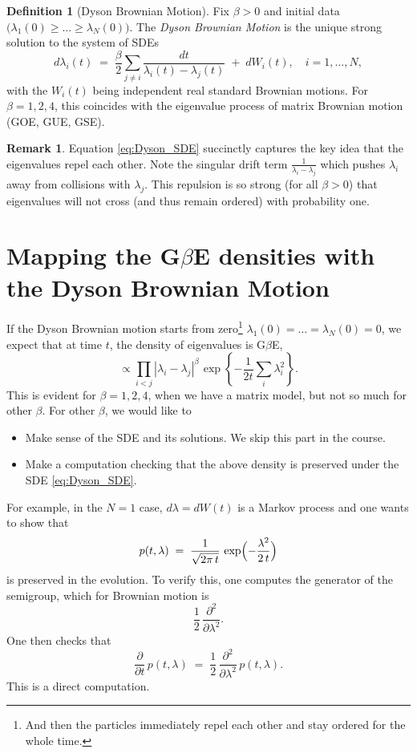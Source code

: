 \documentclass[letterpaper,11pt,oneside,reqno]{article}
\numberwithin{equation}{section}
\newcommand{\ssp}{\hspace{1pt}}
\theoremstyle{definition}
\newtheorem{definition}[proposition]{Definition}
\newtheorem{remark}[proposition]{Remark}
\begin{document}
\begin{definition}[Dyson Brownian Motion]
\label{def:DBM}
Fix $\beta>0$ and initial data $\bigl(\lambda_1(0)\ge \dots \ge \lambda_N(0)\bigr)$. The \emph{Dyson Brownian Motion} is the unique strong solution to the system of SDEs
\begin{equation}
\label{eq:Dyson_SDE}
d\lambda_i(t)
\;=\;
\frac{\beta}{2}\sum_{j\neq i}\frac{dt}{\lambda_i(t)-\lambda_j(t)}
\;+\;
dW_i(t),
\quad
i=1,\dots,N,
\end{equation}
with the $W_i(t)$ being independent real standard Brownian motions. For $\beta=1,2,4$, this coincides with the eigenvalue process of matrix Brownian motion (GOE, GUE, GSE).
\end{definition}

\begin{remark}
	Equation \eqref{eq:Dyson_SDE} succinctly captures the key idea that the eigenvalues repel each other. Note the singular drift term $\frac{1}{\lambda_i-\lambda_j}$ which pushes $\lambda_i$ away from collisions with $\lambda_j$. This repulsion is so strong (for all $\beta>0$)
	that eigenvalues will not cross (and thus remain ordered) with probability one.
\end{remark}

\section{Mapping the G$\beta$E densities with the Dyson Brownian Motion}

If the Dyson Brownian motion starts from zero\footnote{And then the particles immediately
repel each other and stay ordered for the whole time.}
$\lambda_1(0)=\dots=\lambda_N(0)=0$,
we expect that at time $t$, the density of eigenvalues
is G$\beta$E,
\begin{equation*}
	\propto \prod_{i<j}|\lambda_i-\lambda_j|^{\beta}\ssp
	\exp\left\{ -\frac{1}{2t}\sum_{i}\lambda_i^2 \right\}.
\end{equation*}
This is evident for $\beta=1,2,4$, when we have a matrix model, but not so
much for other $\beta$. For other $\beta$, we would like to
\begin{itemize}
\item Make sense of the SDE and its solutions. We skip this part in the course.
\item Make a computation checking that the above density is preserved under the SDE
\eqref{eq:Dyson_SDE}.
\end{itemize}

For example,
in the $N=1$ case, $d\lambda = dW(t)$ is a Markov process and one wants to show that
\[
p(t,\lambda) \;=\; \frac{1}{\sqrt{2\pi\,t}}\,
\exp\Bigl(-\frac{\lambda^{2}}{2\,t}\Bigr)
\]
is preserved in the evolution.  To verify this, one computes the generator
of the semigroup, which for Brownian motion is
\[
\frac{1}{2}\,\frac{\partial^{2}}{\partial\lambda^{2}}.
\]
One then checks that
\[
\frac{\partial}{\partial t}\,p(t,\lambda)
\;=\;
\frac{1}{2}\,\frac{\partial^{2}}{\partial\lambda^{2}}\,p(t,\lambda).
\]
This is a direct computation.
\end{document}
